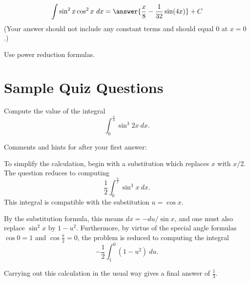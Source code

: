 \documentclass{ximera}
\begin{document}
\begin{exercise}%
\[ \int \sin^2 x\cos^2 x\ dx = \answer{\frac{x}{8}-\frac{1}{32} \sin (4 x)}+ C \]
(Your answer should not include any constant terms and should equal $0$ at $x = 0$.)
\begin{hint}
Use power reduction formulas.
\end{hint}
%
%
\end{exercise}


\section*{Sample Quiz Questions}

\begin{question}%

Compute the value of the integral
\[\int_{0}^{\frac{\pi}{4}} \sin^{3} 2x ~dx.\]
\begin{multiplechoice}
\end{multiplechoice}
Comments and hints for after your first answer:
\begin{feedback}
To simplify the calculation, begin with a substitution which replaces \(x\) with \(x/2\). The question reduces to computing
\[\frac{1}{2}\int_{0}^{\frac{\pi}{2}} \sin^{3} x ~dx.\]
This integral is compatible with the substitution \(u = \cos x\). \begin{hint} By the substitution formula, this means \(dx = - du / \sin x\), and one must also replace \(\sin^2 x\) by \(1 - u^2\). Furthermore, by virtue of the special angle formulas \(\cos 0 = 1\) and \(\cos \frac{\pi}{2} = 0\), the problem is reduced to computing the integral
\[-\frac{1}{2}\int_{1}^{0} (1 - u^2) ~du.\]
\begin{hint}
Carrying out this calculation in the usual way gives a final answer of \(\frac{1}{3}\).
\end{hint}
\end{hint}
\end{feedback}

\end{question}
\end{document}
